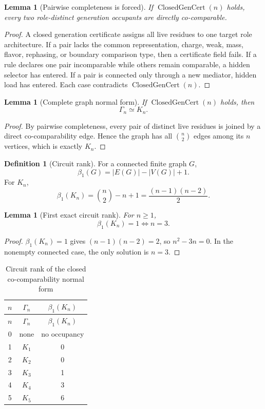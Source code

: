 \documentclass[11pt]{article}
\newcommand{\ClosedGenCert}{\operatorname{ClosedGenCert}}
\theoremstyle{definition}
\newtheorem{definition}{Definition}[section]
\theoremstyle{plain}
\newtheorem{lemma}[theorem]{Lemma}
\theoremstyle{remark}
\begin{document}
\begin{lemma}[Pairwise completeness is forced]
If \(\ClosedGenCert(n)\) holds, every two role-distinct generation occupants are directly co-comparable.
\end{lemma}
\begin{proof}
A closed generation certificate assigns all live residues to one target role architecture. If a pair lacks the common representation, charge, weak, mass, flavor, rephasing, or boundary comparison type, then a certificate field fails. If a rule declares one pair incomparable while others remain comparable, a hidden selector has entered. If a pair is connected only through a new mediator, hidden load has entered. Each case contradicts \(\ClosedGenCert(n)\).
\end{proof}

\begin{lemma}[Complete graph normal form]
If \(\ClosedGenCert(n)\) holds, then
\[
\Gamma_n\simeq K_n.
\]
\end{lemma}
\begin{proof}
By pairwise completeness, every pair of distinct live residues is joined by a direct co-comparability edge. Hence the graph has all \(\binom n2\) edges among its \(n\) vertices, which is exactly \(K_n\).
\end{proof}

\begin{definition}[Circuit rank]
For a connected finite graph \(G\),
\[
\beta_1(G)=|E(G)|-|V(G)|+1.
\]
For \(K_n\),
\[
\beta_1(K_n)=\binom n2-n+1=\frac{(n-1)(n-2)}{2}.
\]
\end{definition}

\begin{lemma}[First exact circuit rank]
For \(n\ge 1\),
\[
\beta_1(K_n)=1\Longleftrightarrow n=3.
\]
\end{lemma}
\begin{proof}
\(\beta_1(K_n)=1\) gives \((n-1)(n-2)=2\), so \(n^2-3n=0\). In the nonempty connected case, the only solution is \(n=3\).
\end{proof}

\begin{longtable}{ccc}
\caption{Circuit rank of the closed co-comparability normal form}\label{tab:rank}\\
\toprule
\(n\) & \(\Gamma_n\) & \(\beta_1(K_n)\)\\
\midrule
\endfirsthead
\toprule
\(n\) & \(\Gamma_n\) & \(\beta_1(K_n)\)\\
\midrule
\endhead
0 & none & no occupancy\\
1 & \(K_1\) & 0\\
2 & \(K_2\) & 0\\
3 & \(K_3\) & 1\\
4 & \(K_4\) & 3\\
5 & \(K_5\) & 6\\
\bottomrule
\end{longtable}
\end{document}

